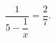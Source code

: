 \begin{ex}[type=equation]
	\begin{condition}
		$\dfrac{1}{5 - \dfrac{1}{x}} = \dfrac{2}{7}.$
	\end{condition}
\end{ex}